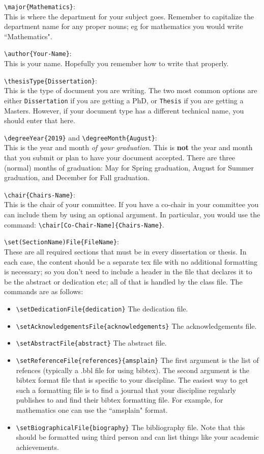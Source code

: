 \documentclass{article}
\begin{document}
        \verb|\major{Mathematics}|:\\ This is where the department for your subject goes. Remember to capitalize the department name for any proper nouns; eg for mathematics you would write ``Mathematics".
        
        \verb|\author{Your-Name}|:\\ This is your name. Hopefully you remember how to write that properly.
        
        \verb|\thesisType{Dissertation}|: \\ This is the type of document you are writing. The two most common options are either \verb|Dissertation| if you are getting a PhD, or \verb|Thesis| if you are getting a Masters. However, if your document type has a different technical name, you should enter that here.
        
        \verb|\degreeYear{2019}| and \verb|\degreeMonth{August}|: \\ This is the year and month \textit{of your graduation}. This is \textbf{not} the year and month that you submit or plan to have your document accepted. There are three (normal) months of graduation: May for Spring graduation, August for Summer graduation, and December for Fall graduation.
        
        \verb|\chair{Chairs-Name}|: \\ This is the chair of your committee. If you have a co-chair in your committee you can include them by using an optional argument. In particular, you would use the command: \verb|\chair[Co-Chair-Name]{Chairs-Name}|.
        
        \verb|\set(SectionName)File{FileName}|:\\ These are all required sections that must be in every dissertation or thesis. In each case, the content should be a separate tex file with no additional formatting is necessary; so you don't need to include a header in the file that declares it to be the abstract or dedication etc; all of that is handled by the class file. The commands are as follows: 
        \begin{itemize}
            \item \verb|\setDedicationFile{dedication}| The dedication file.
            \item \verb|\setAcknowledgementsFile{acknowledgements}| The acknowledgements file.
            \item \verb|\setAbstractFile{abstract}| The abstract file.
            \item \verb|\setReferenceFile{references}{amsplain}| The first argument is the list of refences (typically a .bbl file for using bibtex). The second argument is the bibtex format file that is specific to your discipline. The easiest way to get such a formatting file is to find a journal that your discipline regularly publishes to and find their bibtex formatting file. For example, for mathematics one can use the ``amsplain" format.
            \item \verb|\setBiographicalFile{biography}| The bibliography file. Note that this should be formatted using third person and can list things like your academic achievements.
        \end{itemize}
        
\end{document}
